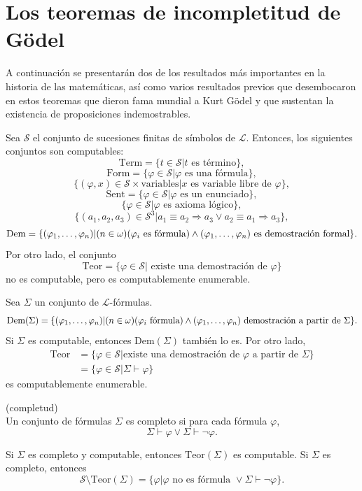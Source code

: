 \section{Los teoremas de incompletitud de Gödel}
\label{sec18}
A continuación se presentarán dos de los resultados más importantes en la historia de las matemáticas, así como varios resultados previos que desembocaron en estos teoremas que dieron fama mundial a Kurt Gödel y que sustentan la existencia de proposiciones indemostrables.

\begin{obs}
    Sea $\mathcal{S}$ el conjunto de sucesiones finitas de símbolos de $\mathcal{L}$. Entonces, los siguientes conjuntos son computables:
    \[\text{Term}=\{t\in\mathcal{S}|t\text{ es término}\},\]
    \[\text{Form}=\{\varphi\in\mathcal{S}|\varphi\text{ es una fórmula}\},\]
    \[\{(\varphi,x)\in\mathcal{S}\times\text{variables}|x\text{ es variable libre de }\varphi\},\]
    \[\text{Sent}=\{\varphi\in\mathcal{S}|\varphi\text{ es un enunciado}\},\]
    \[\{\varphi\in\mathcal{S}|\varphi\text{ es axioma lógico}\},\]
    \[\{(a_1,a_2,a_3)\in\mathcal{S}^3|a_1\equiv a_2\Rightarrow a_3\lor a_2\equiv a_1\Rightarrow a_3\},\]
    \[\text{Dem}=\{(\varphi_1,\ldots,\varphi_n)|(n\in\omega)(\varphi_i\text{ es fórmula})\land(\varphi_1,\ldots,\varphi_n)\text{ es demostración formal}\}.\]
    Por otro lado, el conjunto
    \[\text{Teor}=\{\varphi\in\mathcal{S}|\text{ existe una demostración de }\varphi\}\]
    no es computable, pero es computablemente enumerable.
\end{obs}

\begin{prop}
    Sea $\Sigma$ un conjunto de $\mathcal{L}$-fórmulas.
    \[\text{Dem}(\Sigma)=\{(\varphi_1,\ldots,\varphi_n)|(n\in\omega)(\varphi_i\text{ fórmula})\land(\varphi_1,\ldots,\varphi_n)\text{ demostración a partir de $\Sigma$}\}.\]
    Si $\Sigma$ es computable, entonces $\text{Dem}(\Sigma)$ también lo es. Por otro lado,
    \begin{align*}
        \text{Teor} &= \{\varphi\in\mathcal{S}|\text{existe una demostración de }\varphi\text{ a partir de }\Sigma\} \\
        &= \{\varphi\in\mathcal{S}|\Sigma\vdash\varphi\}
    \end{align*}
    es computablemente enumerable.
\end{prop}
\begin{defn} (completud)\\
    Un conjunto de fórmulas $\Sigma$ es completo si para cada fórmula $\varphi$, 
    \[\Sigma\vdash\varphi\lor \Sigma\vdash\neg\varphi.\]
\end{defn}
\begin{obs}
    Si $\Sigma$ es completo y computable, entonces $\text{Teor}(\Sigma)$ es computable.
    Si $\Sigma$ es completo, entonces
    \[\mathcal{S}\setminus\text{Teor}(\Sigma)=\{\varphi|\varphi\text{ no es fórmula }\lor \Sigma\vdash\neg\varphi\}.\]
\end{obs}

